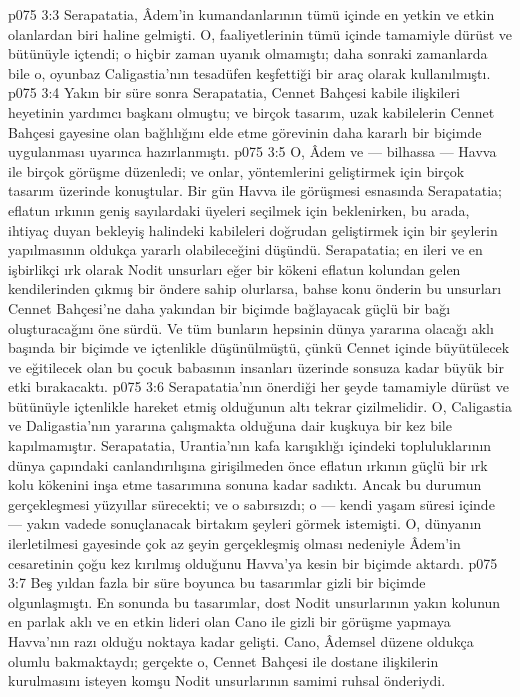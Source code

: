 \vs p075 3:3 Serapatatia, Âdem’in kumandanlarının tümü içinde en yetkin ve etkin olanlardan biri haline gelmişti. O, faaliyetlerinin tümü içinde tamamiyle dürüst ve bütünüyle içtendi; o hiçbir zaman uyanık olmamıştı; daha sonraki zamanlarda bile o, oyunbaz Caligastia’nın tesadüfen keşfettiği bir araç olarak kullanılmıştı.
\vs p075 3:4 Yakın bir süre sonra Serapatatia, Cennet Bahçesi kabile ilişkileri heyetinin yardımcı başkanı olmuştu; ve birçok tasarım, uzak kabilelerin Cennet Bahçesi gayesine olan bağlılığını elde etme görevinin daha kararlı bir biçimde uygulanması uyarınca hazırlanmıştı.
\vs p075 3:5 O, Âdem ve --- bilhassa --- Havva ile birçok görüşme düzenledi; ve onlar, yöntemlerini geliştirmek için birçok tasarım üzerinde konuştular. Bir gün Havva ile görüşmesi esnasında Serapatatia; eflatun ırkının geniş sayılardaki üyeleri seçilmek için beklenirken, bu arada, ihtiyaç duyan bekleyiş halindeki kabileleri doğrudan geliştirmek için bir şeylerin yapılmasının oldukça yararlı olabileceğini düşündü. Serapatatia; en ileri ve en işbirlikçi ırk olarak Nodit unsurları eğer bir kökeni eflatun kolundan gelen kendilerinden çıkmış bir öndere sahip olurlarsa, bahse konu önderin bu unsurları Cennet Bahçesi’ne daha yakından bir biçimde bağlayacak güçlü bir bağı oluşturacağını öne sürdü. Ve tüm bunların hepsinin dünya yararına olacağı aklı başında bir biçimde ve içtenlikle düşünülmüştü, çünkü Cennet içinde büyütülecek ve eğitilecek olan bu çocuk babasının insanları üzerinde sonsuza kadar büyük bir etki bırakacaktı.
\vs p075 3:6 Serapatatia’nın önerdiği her şeyde tamamiyle dürüst ve bütünüyle içtenlikle hareket etmiş olduğunun altı tekrar çizilmelidir. O, Caligastia ve Daligastia’nın yararına çalışmakta olduğuna dair kuşkuya bir kez bile kapılmamıştır. Serapatatia, Urantia’nın kafa karışıklığı içindeki topluluklarının dünya çapındaki canlandırılışına girişilmeden önce eflatun ırkının güçlü bir ırk kolu kökenini inşa etme tasarımına sonuna kadar sadıktı. Ancak bu durumun gerçekleşmesi yüzyıllar sürecekti; ve o sabırsızdı; o --- kendi yaşam süresi içinde --- yakın vadede sonuçlanacak birtakım şeyleri görmek istemişti. O, dünyanın ilerletilmesi gayesinde çok az şeyin gerçekleşmiş olması nedeniyle Âdem’in cesaretinin çoğu kez kırılmış olduğunu Havva’ya kesin bir biçimde aktardı.
\vs p075 3:7 Beş yıldan fazla bir süre boyunca bu tasarımlar gizli bir biçimde olgunlaşmıştı. En sonunda bu tasarımlar, dost Nodit unsurlarının yakın kolunun en parlak aklı ve en etkin lideri olan Cano ile gizli bir görüşme yapmaya Havva’nın razı olduğu noktaya kadar gelişti. Cano, Âdemsel düzene oldukça olumlu bakmaktaydı; gerçekte o, Cennet Bahçesi ile dostane ilişkilerin kurulmasını isteyen komşu Nodit unsurlarının samimi ruhsal önderiydi.
